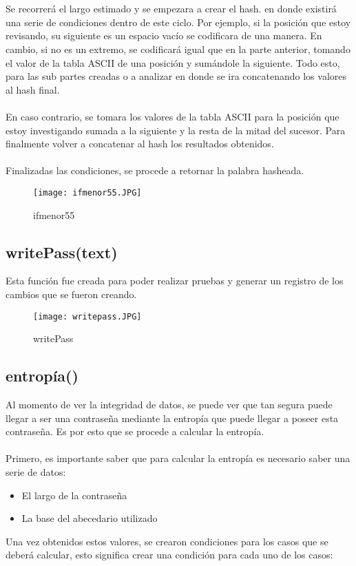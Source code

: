 \documentclass{article}
\begin{document}
\\\\
Se recorrerá el largo estimado y se empezara a crear el hash. en donde existirá una serie de condiciones dentro de este ciclo. Por ejemplo, si la posición que estoy revisando, su siguiente es un espacio vacío se codificara de una manera. En cambio, si no es un extremo, se codificará igual que en la parte anterior, tomando el valor de la tabla ASCII de una posición y sumándole la siguiente. Todo esto, para las sub partes creadas o a analizar en donde se ira concatenando los valores al hash final. 
\\\\ 
En caso contrario, se tomara los valores de la tabla ASCII para la posición que estoy investigando sumada a la siguiente y la resta de la mitad del sucesor. Para finalmente volver a concatenar al hash los resultados obtenidos. 
\\\\
Finalizadas las condiciones, se procede a retornar la palabra hasheada. 
\begin{figure}[h!]
    \centering
    \texttt{[image: ifmenor55.JPG]}
    \caption{ifmenor55}
    \label{fig:my_label}
\end{figure}
\newpage

\subsection{writePass(text)}
Esta función fue creada para poder realizar pruebas y generar un registro de los cambios que se fueron creando. 
\begin{figure}[h]
    \centering
    \texttt{[image: writepass.JPG]}
    \caption{writePass}
    \label{fig:my_label}
\end{figure}

\newpage
\subsection{entropía()}
Al momento de ver la integridad de datos, se puede ver que tan segura puede llegar a ser una contraseña mediante la entropía que puede llegar a poseer esta contraseña. Es por esto que se procede a calcular la entropía.
\\\\
Primero, es importante saber que para calcular la entropía es necesario saber una serie de datos:

\begin{itemize}
    \item El largo de la contraseña
    \item La base del abecedario utilizado
\end{itemize}
Una vez obtenidos estos valores, se crearon condiciones para los casos que se deberá calcular, esto significa crear una condición para cada uno de los casos: 
\end{document}
